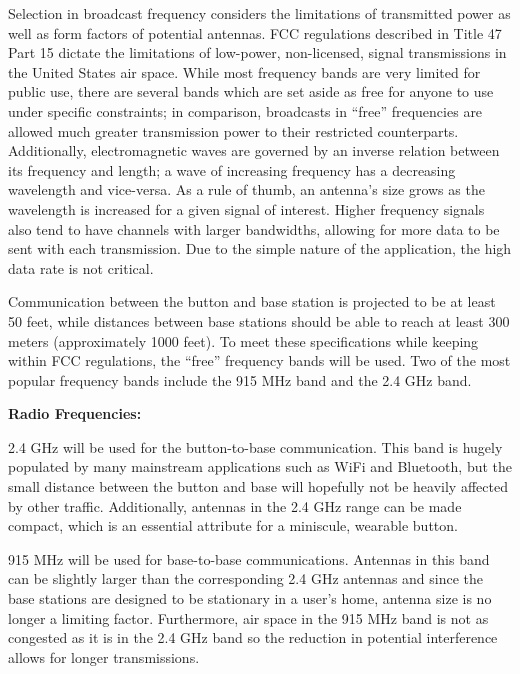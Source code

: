 \documentclass[journal,compsoc]{IEEEtran}
\begin{document}
Selection in broadcast frequency considers the limitations of transmitted power as well as form factors of potential antennas.  FCC regulations described in Title 47 Part 15 dictate the limitations of low-power, non-licensed, signal transmissions in the United States air space.  While most frequency bands are very limited for public use, there are several bands which are set aside as free for anyone to use under specific constraints; in comparison, broadcasts in “free” frequencies are allowed much greater transmission power to their restricted counterparts.  Additionally, electromagnetic waves are governed by an inverse relation between its frequency and length; a wave of increasing frequency has a decreasing wavelength and vice-versa.  As a rule of thumb, an antenna’s size grows as the wavelength is increased for a given signal of interest. Higher frequency signals also tend to have channels with larger bandwidths, allowing for more data to be sent with each transmission.  Due to the simple nature of the application, the high data rate is not critical.

Communication between the button and base station is projected to be at least 50 feet, while distances between base stations should be able to reach at least 300 meters (approximately 1000 feet).  To meet these specifications while keeping within FCC regulations, the “free” frequency bands will be used. Two of the most popular frequency bands include the 915 MHz band and the 2.4 GHz band.

\textbf {Radio Frequencies:}

\begin{LaTeXdescription}
  \item [2.4 GHz] will be used for the button-to-base communication. This band is hugely populated by many mainstream applications such as WiFi and Bluetooth, but the small distance between the button and base will hopefully not be heavily affected by other traffic. Additionally, antennas in the 2.4 GHz range can be made compact, which is an essential attribute for a miniscule, wearable button.
  \item[915 MHz] will be used for base-to-base communications.  Antennas in this band can be slightly larger than the corresponding 2.4 GHz antennas and since the base stations are designed to be stationary in a user’s home, antenna size is no longer a limiting factor.  Furthermore, air space in the 915 MHz band is not as congested as it is in the 2.4 GHz band so the reduction in potential interference allows for longer transmissions.
\end{LaTeXdescription}
\end{document}
